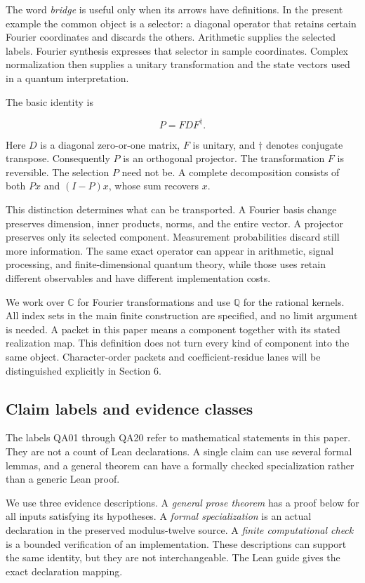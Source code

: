 The word \emph{bridge} is useful only when its arrows have definitions.
In the present example the common object is a selector: a diagonal
operator that retains certain Fourier coordinates and discards the
others. Arithmetic supplies the selected labels. Fourier synthesis
expresses that selector in sample coordinates. Complex normalization
then supplies a unitary transformation and the state vectors used in a
quantum interpretation.

The basic identity is

\[
P=FDF^\dagger.
\]

Here \(D\) is a diagonal zero-or-one matrix, \(F\) is unitary, and
\(\dagger\) denotes conjugate transpose. Consequently \(P\) is an
orthogonal projector. The transformation \(F\) is reversible. The
selection \(P\) need not be. A complete decomposition consists of both
\(Px\) and \((I-P)x\), whose sum recovers \(x\).

This distinction determines what can be transported. A Fourier basis
change preserves dimension, inner products, norms, and the entire
vector. A projector preserves only its selected component. Measurement
probabilities discard still more information. The same exact operator
can appear in arithmetic, signal processing, and finite-dimensional
quantum theory, while those uses retain different observables and have
different implementation costs.

We work over \(\mathbb C\) for Fourier transformations and use
\(\mathbb Q\) for the rational kernels. All index sets in the main
finite construction are specified, and no limit argument is needed. A
packet in this paper means a component together with its stated
realization map. This definition does not turn every kind of component
into the same object. Character-order packets and coefficient-residue
lanes will be distinguished explicitly in Section 6.

\hypertarget{claim-labels-and-evidence-classes}{%
\subsection{Claim labels and evidence
classes}\label{claim-labels-and-evidence-classes}}

The labels QA01 through QA20 refer to mathematical statements in this
paper. They are not a count of Lean declarations. A single claim can use
several formal lemmas, and a general theorem can have a formally checked
specialization rather than a generic Lean proof.

We use three evidence descriptions. A \emph{general prose theorem} has a
proof below for all inputs satisfying its hypotheses. A \emph{formal
specialization} is an actual declaration in the preserved modulus-twelve
source. A \emph{finite computational check} is a bounded verification of
an implementation. These descriptions can support the same identity, but
they are not interchangeable. The Lean guide gives the exact declaration
mapping.

